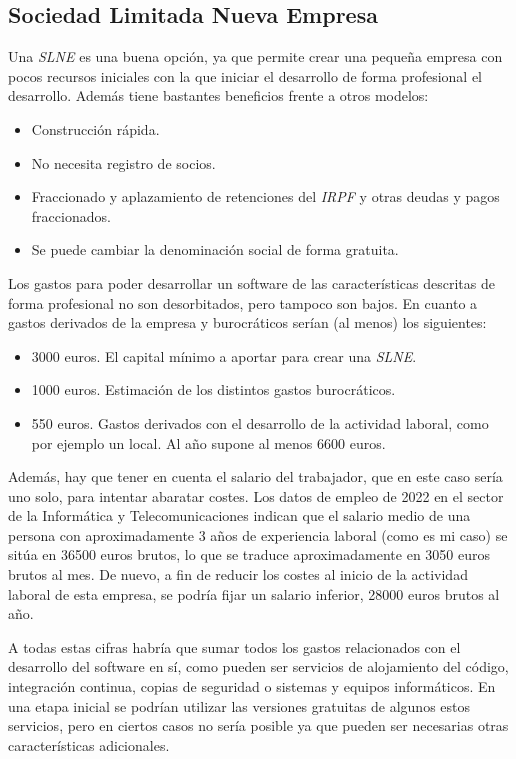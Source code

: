 \subsection{Sociedad Limitada Nueva Empresa}

Una \textit{SLNE} es una buena opción, ya que permite crear una pequeña empresa con pocos recursos iniciales con la que iniciar el desarrollo de forma profesional el desarrollo. Además tiene bastantes beneficios frente a otros modelos:

\begin{itemize}
	\item Construcción rápida.
	\item No necesita registro de socios.
	\item Fraccionado y aplazamiento de retenciones del \textit{IRPF} y otras deudas y pagos fraccionados.
	\item Se puede cambiar la denominación social de forma gratuita.
\end{itemize}

Los gastos para poder desarrollar un software de las características descritas de forma profesional no son desorbitados, pero tampoco son bajos. En cuanto a gastos derivados de la empresa y burocráticos serían (al menos) los siguientes:

\begin{itemize}
	\item 3000 euros. El capital mínimo a aportar para crear una \textit{SLNE}.
	\item 1000 euros. Estimación de los distintos gastos burocráticos.
	\item 550 euros. Gastos derivados con el desarrollo de la actividad laboral, como por ejemplo un local. Al año supone al menos 6600 euros.
\end{itemize}

Además, hay que tener en cuenta el salario del trabajador, que en este caso sería uno solo, para intentar abaratar costes. Los datos de empleo de 2022 en el sector de la Informática y Telecomunicaciones indican que el salario medio de una persona con aproximadamente 3 años de experiencia laboral (como es mi caso) se sitúa en 36500 euros brutos, lo que se traduce aproximadamente en 3050 euros brutos al mes. De nuevo, a fin de reducir los costes al inicio de la actividad laboral de esta empresa, se podría fijar un salario inferior, 28000 euros brutos al año.

A todas estas cifras habría que sumar todos los gastos relacionados con el desarrollo del software en sí, como pueden ser servicios de alojamiento del código, integración continua, copias de seguridad o sistemas y equipos informáticos. En una etapa inicial se podrían utilizar las versiones gratuitas de algunos estos servicios, pero en ciertos casos no sería posible ya que pueden ser necesarias otras características adicionales.

